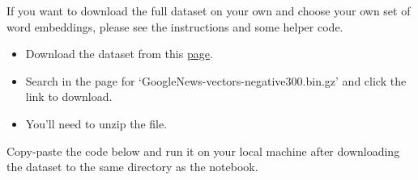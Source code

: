 \documentclass[11pt]{article}
\providecommand{\tightlist}{%
      \setlength{\itemsep}{0pt}\setlength{\parskip}{0pt}}
\begin{document}
If you want to download the full dataset on your own and choose your own
set of word embeddings, please see the instructions and some helper
code.

\begin{itemize}
\tightlist
\item
  Download the dataset from this
  \href{https://code.google.com/archive/p/word2vec/}{page}.
\item
  Search in the page for `GoogleNews-vectors-negative300.bin.gz' and
  click the link to download.
\item
  You'll need to unzip the file.
\end{itemize}

    Copy-paste the code below and run it on your local machine after
downloading the dataset to the same directory as the notebook.
\end{document}
